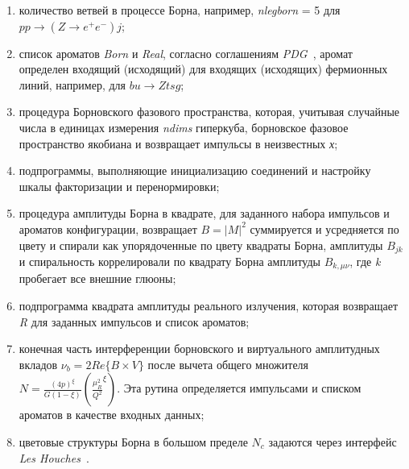 \begin{enumerate}
	\item количество ветвей в процессе Борна, например, \textit{nlegborn} = 5 для $pp \rightarrow (Z \rightarrow {e}^{+}{e}^{-}) j$;
	\item список ароматов \textit{Born} и \textit{Real}, согласно соглашениям \textit{PDG}~\cite{review-powheg}, аромат
	определен входящий (исходящий) для входящих (исходящих) фермионных линий, например, для $bu \rightarrow Ztsg$;
	\item процедура Борновского фазового пространства, которая, учитывая случайные числа в единицах измерения \textit{ndims}
	гиперкуба, борновское фазовое пространство якобиана и возвращает импульсы в неизвестных \textit{х};
	\item подпрограммы, выполняющие инициализацию соединений и настройку
	шкалы факторизации и перенормировки;
	\item процедура амплитуды Борна в квадрате, для заданного набора импульсов и ароматов
	конфигурации, возвращает $B = {|M|}^{2}$
	суммируется и усредняется по цвету и спирали
	как упорядоченные по цвету квадраты Борна, амплитуды ${B}_{jk}$ и спиральность коррелировали по квадрату Борна
	амплитуды ${B}_{k,\mu\nu}$, где \textit{k} пробегает все внешние глюоны;
	\item подпрограмма квадрата амплитуды реального излучения, которая возвращает \textit{R} для заданных импульсов и
	список ароматов;
	\item конечная часть интерференции борновского и виртуального амплитудных вкладов ${\nu}_{b} = 2Re\{B\times V\}$ после вычета общего множителя $N = \frac{{(4p)}^\xi}{G(1-\xi)}({\frac{{\mu}_{R}^{2}}{{Q}^{2}}}^{\xi})$. Эта рутина определяется импульсами и списком ароматов в качестве входных данных;
	\item цветовые структуры Борна в большом пределе ${N}_{c}$ задаются через интерфейс \textit{Les Houches}~\cite{review-powheg}.
\end{enumerate}

